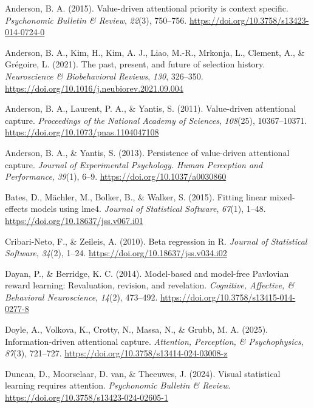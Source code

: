 \documentclass[
  man,
  floatsintext,
  longtable,
  nolmodern,
  notxfonts,
  notimes,
  colorlinks=true,linkcolor=blue,citecolor=blue,urlcolor=blue]{apa7}
\newlength{\cslhangindent}
\newenvironment{CSLReferences}[2] %
 {\begin{list}{}{%
  \setlength{\itemindent}{0pt}
  \setlength{\leftmargin}{0pt}
  \setlength{\parsep}{0pt}
  \ifodd #1
   \setlength{\leftmargin}{\cslhangindent}
   \setlength{\itemindent}{-1\cslhangindent}
  \fi
  \setlength{\itemsep}{#2\baselineskip}}}
 {\end{list}}
\begin{document}
\label{refs}
\begin{CSLReferences}{1}{0}
Anderson, B. A. (2015). Value-driven attentional priority is context
specific. \emph{Psychonomic Bulletin \& Review}, \emph{22}(3), 750--756.
\url{https://doi.org/10.3758/s13423-014-0724-0}

Anderson, B. A., Kim, H., Kim, A. J., Liao, M.-R., Mrkonja, L., Clement,
A., \& Grégoire, L. (2021). The past, present, and future of selection
history. \emph{Neuroscience \& Biobehavioral Reviews}, \emph{130},
326--350. \url{https://doi.org/10.1016/j.neubiorev.2021.09.004}

Anderson, B. A., Laurent, P. A., \& Yantis, S. (2011). Value-driven
attentional capture. \emph{Proceedings of the National Academy of
Sciences}, \emph{108}(25), 10367--10371.
\url{https://doi.org/10.1073/pnas.1104047108}

Anderson, B. A., \& Yantis, S. (2013). Persistence of value-driven
attentional capture. \emph{Journal of Experimental Psychology. Human
Perception and Performance}, \emph{39}(1), 6--9.
\url{https://doi.org/10.1037/a0030860}

Bates, D., Mächler, M., Bolker, B., \& Walker, S. (2015). Fitting linear
mixed-effects models using {lme4}. \emph{Journal of Statistical
Software}, \emph{67}(1), 1--48.
\url{https://doi.org/10.18637/jss.v067.i01}

Cribari-Neto, F., \& Zeileis, A. (2010). Beta regression in {R}.
\emph{Journal of Statistical Software}, \emph{34}(2), 1--24.
\url{https://doi.org/10.18637/jss.v034.i02}

Dayan, P., \& Berridge, K. C. (2014). Model-based and model-free
Pavlovian reward learning: Revaluation, revision, and revelation.
\emph{Cognitive, Affective, \& Behavioral Neuroscience}, \emph{14}(2),
473--492. \url{https://doi.org/10.3758/s13415-014-0277-8}

Doyle, A., Volkova, K., Crotty, N., Massa, N., \& Grubb, M. A. (2025).
Information-driven attentional capture. \emph{Attention, Perception, \&
Psychophysics}, \emph{87}(3), 721--727.
\url{https://doi.org/10.3758/s13414-024-03008-z}

Duncan, D., Moorselaar, D. van, \& Theeuwes, J. (2024). Visual
statistical learning requires attention. \emph{Psychonomic Bulletin \&
Review}. \url{https://doi.org/10.3758/s13423-024-02605-1}


\end{CSLReferences}
\end{document}
